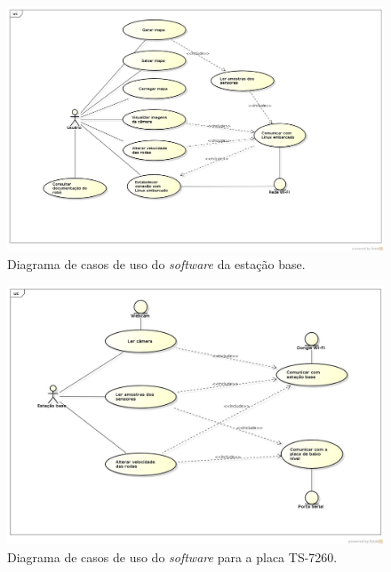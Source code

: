 \begin{figure}[H]
  \centering
  \includegraphics[width=\textwidth, keepaspectratio]{./figuras/estacaoBase/usecase_estacao_base.jpg}
  \caption{Diagrama de casos de uso do \textit{software} da estação base.}
  \label{fig:diagrama_caso_uso_estacao_base}
\end{figure}

\begin{figure}[H]
  \centering
  \includegraphics[width=\textwidth, keepaspectratio]{./figuras/sistEmbarcado/usecase_linux_embarcado.jpg}
  \caption{Diagrama de casos de uso do \textit{software} para a placa TS-7260.}
  \label{fig:diagrama_caso_uso_linux_embarcado}
\end{figure}

